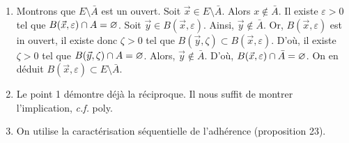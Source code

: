 \begin{prv}
	\begin{enumerate}
		\item Montrons que $E \setminus \bar{A}$ est un ouvert. Soit $\vec{x} \in E \setminus \bar{A}$.
			Alors $x \not\in \bar{A}$.
			Il existe $\varepsilon > 0$\/ tel que $B(\vec{x}, \varepsilon) \cap A = \varnothing$.
			Soit $\vec{y} \in B(\vec{x}, \varepsilon)$.
			Ainsi, $\vec{y} \not\in \bar{A}$. Or, $B(\vec{x}, \varepsilon)$\/ est in ouvert, il existe donc $\zeta > 0$\/ tel que $B(\vec{y}, \zeta) \subset B(\vec{x}, \varepsilon)$.
			D'où, il existe $\zeta > 0$ tel que $B(\vec{y}, \zeta) \cap A = \varnothing$.
			Alors, $\vec{y} \not\in \bar{A}$.
			D'où, $B(\vec{x}, \varepsilon) \cap \bar{A} = \varnothing$.
			On en déduit $B(\vec{x}, \varepsilon) \subset  E \setminus \bar{A}$.
		\item Le point 1 démontre déjà la réciproque. Il nous suffit de montrer l'implication, \textit{c.f.} poly.
		\item On utilise la caractérisation séquentielle de l'adhérence (proposition 23).
	\end{enumerate}
\end{prv}

